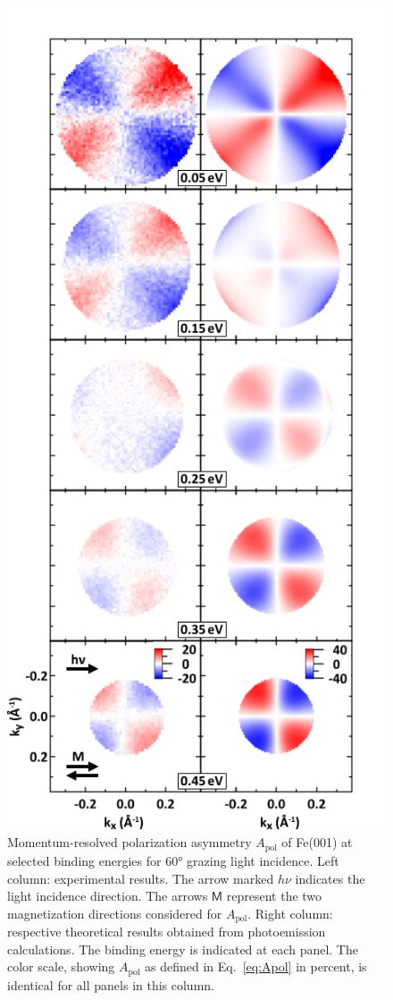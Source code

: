 \documentclass[prl,twocolumn,floatfix,superscriptaddress,aps]{revtex4-2}
\begin{document}
\begin{figure}
    \centering
    \includegraphics[width = 0.7\columnwidth]{FePaperApol.pdf}
    \caption{Momentum-resolved polarization asymmetry $A_{\mathrm{pol}}$ of Fe(001) at selected binding energies for 60° grazing light incidence. Left column: experimental results. The arrow marked $h \nu$ indicates the light incidence direction. The arrows $\textsf{M}$ represent the two magnetization directions considered for $A_{\mathrm{pol}}$. Right column: respective theoretical results obtained from photoemission calculations. The binding energy is indicated at each panel. The color scale, showing $A_{\mathrm{pol}}$ as defined in Eq.~\eqref{eq:Apol} in percent, is identical for all panels in this column. 
    }
    \label{fig:Apol}
\end{figure}
\end{document}
